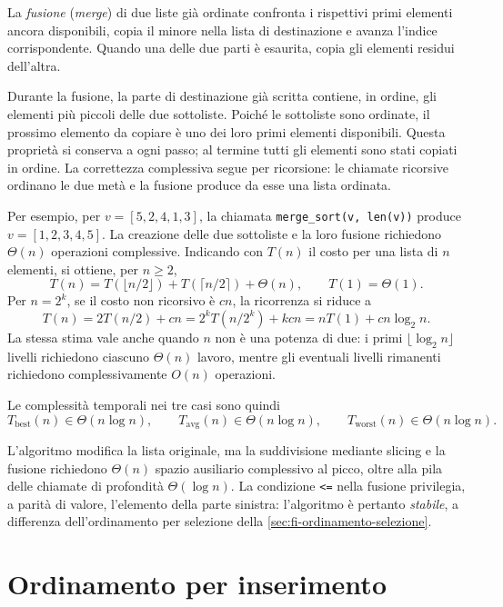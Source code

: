 La \emph{fusione} (\emph{merge}) di due liste già ordinate confronta
i rispettivi primi elementi ancora disponibili, copia il minore
nella lista di destinazione e avanza l'indice corrispondente. Quando
una delle due parti è esaurita, copia gli elementi residui dell'altra.

\clearpage



Durante la fusione, la parte di destinazione già scritta contiene,
in ordine, gli elementi più piccoli delle due sottoliste.
Poiché le sottoliste sono ordinate, il prossimo elemento da copiare
è uno dei loro primi elementi disponibili. Questa proprietà si
conserva a ogni passo; al termine tutti gli elementi sono stati
copiati in ordine. La correttezza complessiva segue per ricorsione:
le chiamate ricorsive ordinano le due metà e la fusione produce
da esse una lista ordinata.

Per esempio, per \(v=[5,2,4,1,3]\), la chiamata
\texttt{merge\_sort(v, len(v))} produce \(v=[1,2,3,4,5]\).
La creazione delle due sottoliste e la loro fusione richiedono
\(\Theta(n)\) operazioni complessive. Indicando con \(T(n)\) il costo
per una lista di \(n\) elementi, si ottiene, per \(n\ge2\),
\[
  T(n)=T(\lfloor n/2\rfloor)
       +T(\lceil n/2\rceil)+\Theta(n),
  \qquad T(1)=\Theta(1).
\]
Per \(n=2^k\), se il costo non ricorsivo è \(cn\), la ricorrenza
si riduce a
\[
  T(n)=2T(n/2)+cn
       =2^kT(n/2^k)+kcn
       =nT(1)+cn\log_2 n.
\]
La stessa stima vale anche quando \(n\) non è una potenza di due:
i primi \(\lfloor\log_2 n\rfloor\) livelli richiedono ciascuno
\(\Theta(n)\) lavoro, mentre gli eventuali livelli rimanenti
richiedono complessivamente \(O(n)\) operazioni.

Le complessità temporali nei tre casi sono quindi
\[
  T_{\mathrm{best}}(n)\in\Theta(n\log n),\qquad
  T_{\mathrm{avg}}(n)\in\Theta(n\log n),\qquad
  T_{\mathrm{worst}}(n)\in\Theta(n\log n).
\]

\clearpage

L'algoritmo modifica la lista originale, ma la suddivisione mediante
slicing e la fusione richiedono \(\Theta(n)\) spazio ausiliario
complessivo al picco, oltre alla pila delle chiamate di profondità
\(\Theta(\log n)\). La condizione \lstinline|<=| nella fusione
privilegia, a parità di valore, l'elemento della parte sinistra:
l'algoritmo è pertanto \emph{stabile}, a differenza dell'ordinamento
per selezione della \cref{sec:fi-ordinamento-selezione}.

\section{Ordinamento per inserimento}
\label{sec:fi-ordinamento-inserimento}

